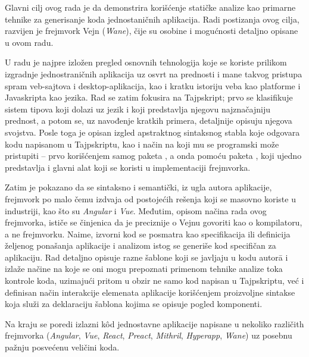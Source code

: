 Glavni cilj ovog rada je da demonstrira korišćenje statičke analize kao primarne tehnike za generisanje koda jednostaničnih aplikacija.
Radi postizanja ovog cilja, razvijen je frejmvork Vejn (\textsl{Wane}), čije su osobine i mogućnosti detaljno opisane u ovom radu.

U radu je najpre izložen pregled osnovnih tehnologija koje se koriste prilikom izgradnje jednostraničnih aplikacija uz osvrt na prednosti i mane takvog pristupa spram veb-sajtova i desktop-aplikacija, kao i kratku istoriju veba kao platforme i Javaskripta kao jezika.
Rad se zatim fokusira na Tajpskript; prvo se klasifikuje sistem tipova koji dolazi uz jezik i koji predstavlja njegovu najznačajniju prednost, a potom se, uz navođenje kratkih primera, detaljnije opisuju njegova svojstva.
Posle toga je opisan izgled apstraktnog sintaksnog stabla koje odgovara kodu napisanom u Tajpskriptu, kao i način na koji mu se programski može pristupiti -- prvo korišćenjem samog paketa , a onda pomoću paketa , koji ujedno predstavlja i glavni alat koji se koristi u implementaciji frejmvorka.

Zatim je pokazano da se sintaksno i semantički, iz ugla autora aplikacije, frejmvork po malo čemu izdvaja od postojećih rešenja koji se masovno koriste u industriji, kao što su \textsl{Angular} i \textsl{Vue}.
Međutim, opisom načina rada ovog frejmvorka, ističe se činjenica da je preciznije o Vejnu govoriti kao o kompilatoru, a ne frejmvorku.
Naime, izvorni kod se posmatra kao specifikacija ili definicija željenog ponašanja aplikacije i analizom istog se generiše kod specifičan za aplikaciju.
Rad detaljno opisuje razne šablone koji se javljaju u kodu autor\=a i izlaže načine na koje se oni mogu prepoznati primenom tehnike analize toka kontrole koda, uzimajući pritom u obzir ne samo kod napisan u Tajpskriptu, već i definisan način interakcije elemenata aplikacije korišćenjem proizvoljne sintakse koja služi za deklaraciju šablona kojima se opisuje pogled komponenti.

Na kraju se poredi izlazni kôd jednostavne  aplikacije napisane u nekoliko različith frejmvorka (\textsl{Angular}, \textsl{Vue}, \textsl{React}, \textsl{Preact}, \textsl{Mithril}, \textsl{Hyperapp}, \textsl{Wane}) uz posebnu pažnju posvećenu veličini koda.
